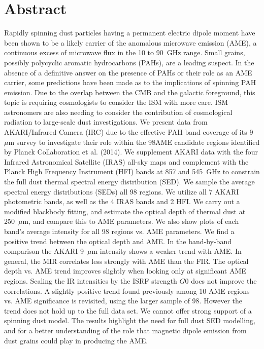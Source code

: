 \chapter*{Abstract}
Rapidly spinning dust particles having a permanent electric dipole moment have been shown to be a likely carrier of the anomalous microwave emission (AME), a continuous excess of microwave flux in the 10 to 90~GHz range. Small grains, possibly polycyclic aromatic hydrocarbons (PAHs), are a leading suspect. In the absence of a definitive answer on the presence of PAHs or their role as an AME carrier, some predictions have been made as to the implications of spinning PAH emission. Due to the overlap between the CMB and the galactic foreground, this topic is requiring cosmologists to consider the ISM with more care. ISM astronomers are also needing to consider the contribution of cosmological radiation to large-scale dust investigations. We present data from AKARI/Infrared Camera (IRC) due to the effective PAH band coverage of its 9~$\mu$m survey to investigate their role within the 98AME candidate regions identified by Planck Collaboration et al. (2014). We supplement AKARI data with the four Infrared Astronomical Satellite (IRAS) all-sky maps and complement with the Planck High Frequency Instrument (HFI) bands at 857 and 545~GHz to constrain the full dust thermal spectral energy distribution (SED). We sample the average spectral energy distributions (SEDs) all 98 regions. We utilize all 7 AKARI photometric bands, as well as the 4 IRAS bands and 2 HFI. We carry out a modified blackbody fitting, and estimate the optical depth of thermal dust at 250~$\mu$m, and compare this to AME parameters. We also show plots of each band's average intensity for all 98 regions vs. AME parameters. We find a positive trend between the optical depth and AME. In the band-by-band comparison the AKARI 9~$\mu$m intensity shows a weaker trend with AME. In general, the MIR correlates less strongly with AME than the FIR. The optical depth vs. AME trend improves slightly when looking only at significant AME regions. Scaling the IR intensities by the ISRF strength $G0$ does not improve the correlations. A slightly positive trend found previously among 10 AME regions vs. AME significance is revisited, using the larger sample of 98. However the trend does not hold up to the full data set. We cannot offer strong support of a spinning dust model. The results highlight the need for full dust SED modelling, and for a better understanding of the role that magnetic dipole emission from dust grains could play in producing the AME. 
